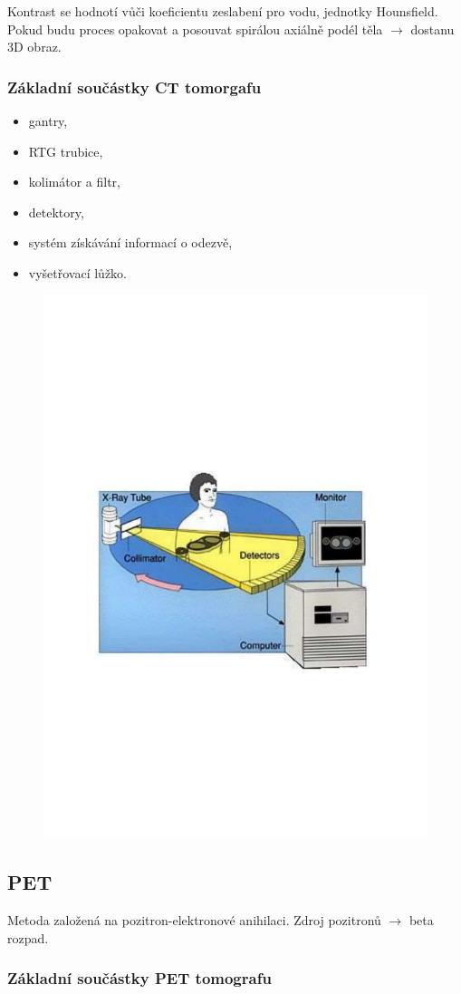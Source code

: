 Kontrast se hodnotí vůči koeficientu zeslabení pro vodu, jednotky Hounsfield. Pokud budu proces opakovat a posouvat spirálou axiálně podél těla $\rightarrow$ dostanu 3D obraz.

\subsubsection{Základní součástky CT tomorgafu}

\begin{itemize}
    \item gantry,
    \item RTG trubice,
    \item kolimátor a filtr,
    \item detektory,
    \item systém získávání informací o odezvě,
    \item vyšetřovací lůžko.
\end{itemize}

\begin{figure}[H]
    \centering
    \includegraphics[width=0.5\linewidth,trim={3cm 7cm 3cm 7cm}, clip]{img/ct_ilustrace.pdf}
\end{figure}

\subsection{PET} 

Metoda založená na pozitron-elektronové anihilaci. Zdroj pozitronů $\rightarrow$ beta rozpad.

\subsubsection{Základní součástky PET tomografu}


